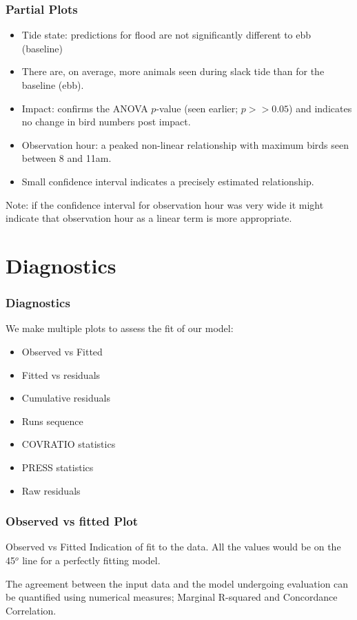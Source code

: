 \begin{frame}
\frametitle{Partial Plots}
\begin{itemize}
\item Tide state: predictions for flood are not significantly different to ebb (baseline)
\item There are, on average, more animals seen during slack tide than for the baseline (ebb). \pause
\item Impact: confirms the ANOVA $p$-value (seen earlier; $p>>0.05$) and indicates no change in bird numbers post impact.
\pause
\item Observation hour: a peaked non-linear relationship with maximum birds seen between 8 and 11am.
\item Small confidence interval indicates a precisely estimated relationship.
\end{itemize}
\pause
\bigskip
Note: if the confidence interval for observation hour was very wide it might indicate that observation hour as a linear term is more appropriate.
\end{frame}

\clearpage

\section{Diagnostics}

\begin{frame}[fragile]
\frametitle{Diagnostics}
We make multiple plots to assess the fit of our model:

\bigskip
\begin{itemize}
\item Observed vs Fitted
\item Fitted vs residuals
\item Cumulative residuals
\item Runs sequence
\item COVRATIO statistics
\item PRESS statistics
\item Raw residuals
\end{itemize}
\end{frame}

\begin{frame}[fragile]
\frametitle{Observed vs fitted Plot}

\begin{block}{Observed vs Fitted}
Indication of fit to the data.  All the values would be on the 45$^o$ line for a perfectly fitting model.    
\end{block}

The agreement between the input data and the model undergoing evaluation can be quantified using numerical measures; Marginal R-squared and Concordance Correlation. 
\end{frame}

